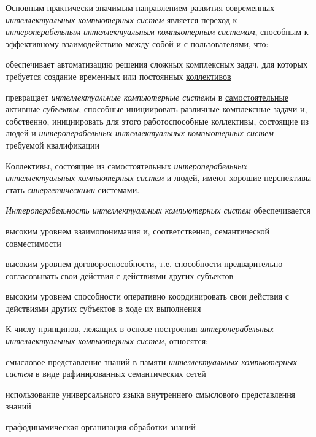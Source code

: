 \begin{textitemize}
	\item Основным практически значимым направлением развития современных \textit{интеллектуальных компьютерных систем} является переход к \textit{интероперабельным} \textit{интеллектуальным компьютерным системам}, способным к эффективному взаимодействию между собой и с пользователями, что:
	\begin{textitemize}
		\item обеспечивает автоматизацию решения сложных комплексных задач, для которых требуется создание временных или постоянных \underline{коллективов}
		\item превращает \textit{интеллектуальные компьютерные системы} в \underline{самостоятельные} активные \textit{субъекты}, способные инициировать различные комплексные задачи и, собственно, инициировать для этого работоспособные коллективы, состоящие из людей и \textit{интероперабельных интеллектуальных компьютерных систем} требуемой квалификации 
	\end{textitemize}
	\item Коллективы, состоящие из самостоятельных \textit{интероперабельных интеллектуальных компьютерных систем} и людей, имеют хорошие перспективы стать \textit{синергетическими} системами.
	\item \textit{Интероперабельность интеллектуальных компьютерных систем} обеспечивается
	\begin{textitemize}
		\item высоким уровнем взаимопонимания и, соответственно, семантической совместимости
		\item высоким уровнем договороспособности, т.е. способности предварительно согласовывать свои действия с действиями других субъектов
		\item высоким уровнем способности оперативно координировать свои действия с действиями других субъектов в ходе их выполнения
	\end{textitemize}
	\item К числу принципов, лежащих в основе построения \textit{интероперабельных интеллектуальных компьютерных систем}, относятся:
	\begin{textitemize}
		\item смысловое представление знаний в памяти \textit{интеллектуальных компьютерных систем} в виде рафинированных семантических сетей
		\item использование универсального языка внутреннего смыслового представления знаний
		\item графодинамическая организация обработки знаний

\end{textitemize}
\end{textitemize}
